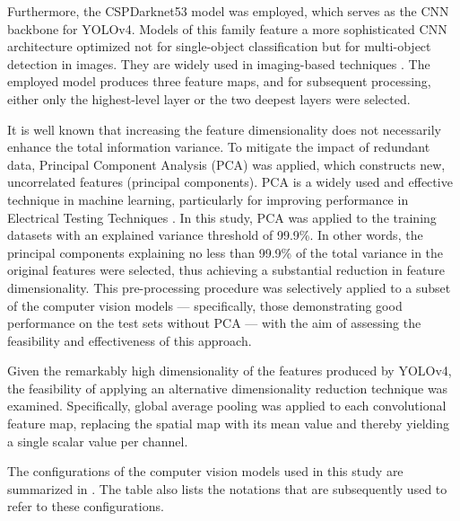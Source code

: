 \documentclass[10pt]{iopart}
\begin{document}
Furthermore, the CSPDarknet53 model was employed, 
which serves as the CNN backbone for YOLOv4. 
Models of this family feature a more sophisticated CNN architecture optimized not for single-object classification 
but for multi-object detection in images. 
They are widely used in imaging-based techniques \cite{Liu2024a, Li2024a, Chen2022}. 
The employed model produces three feature maps, and for subsequent processing, either only the highest-level layer or the two deepest layers were selected.

It is well known that increasing the feature dimensionality does not necessarily enhance the total information variance. 
To mitigate the impact of redundant data, Principal Component Analysis (PCA) was applied, which constructs new, uncorrelated features (principal components). 
PCA is a widely used and effective technique in machine learning, particularly for improving performance in Electrical Testing Techniques \cite{Fadhel2019, Gao2020}. 
In this study, PCA was applied to the training datasets with an explained variance threshold of 99.9\%. 
In other words, the principal components explaining no less than 99.9\% of the total variance in the original features were selected, 
thus achieving a substantial reduction in feature dimensionality. 
This pre-processing procedure was selectively applied to a subset of the computer vision models --- 
specifically, those demonstrating good performance on the test sets without PCA --- with the aim of assessing the feasibility and effectiveness of this approach.

Given the remarkably high dimensionality of the features produced by YOLOv4, 
the feasibility of applying an alternative dimensionality reduction technique was examined. 
Specifically, global average pooling was applied to each convolutional feature map, 
replacing the spatial map with its mean value and thereby yielding a single scalar value per channel.

The configurations of the computer vision models used in this study are summarized in . 
The table also lists the notations that are subsequently used to refer to these configurations.
\end{document}
